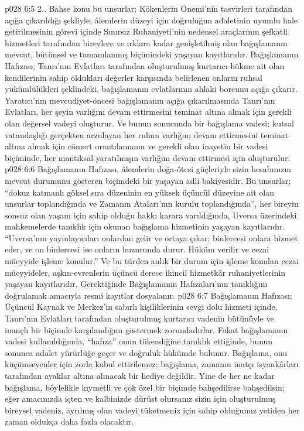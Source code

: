 \vs p028 6:5 2.\bibnobreakspace {}. Bahse konu bu unsurlar; Kökenlerin Önemi’nin tasvirleri tarafından açığa çıkarıldığı şekliyle, âlemlerin düzeyi için doğruluğun adaletinin uyumlu hale getirilmesinin görevi içinde Sınırsız Ruhaniyeti’nin nedensel araçlarının şefkatli hizmetleri tarafından bireylere ve ırklara kadar genişletilmiş olan bağışlamanın mevcut, bütünsel ve tamamlanmış biçimindeki yaşayan kayıtlarıdır. Bağışlamanın Hafızası; Tanrı’nın Evlatları tarafından oluşturulmuş kurtarıcı hükme ait olan kendilerinin sahip oldukları değerler karşısında belirlenen onların ruhsal yükümlülükleri şeklindeki, bağışlamanın evlatlarının ahlaki borcunu açığa çıkarır. Yaratıcı’nın mevcudiyet\hyp{}öncesi bağışlamanın açığa çıkarılmasında Tanrı’nın Evlatları, her şeyin varlığını devam ettirmesini teminat altına almak için gerekli olan değersel vadeyi oluşturur. Ve bunun sonucunda bir bağışlama vadesi; kutsal vatandaşlığı gerçekten arzulayan her ruhun varlığını devam ettirmesini teminat altına almak için cömert orantılamanın ve gerekli olan inayetin bir vadesi biçiminde, her mantıksal yaratılmışın varlığını devam ettirmesi için oluşturulur.
\vs p028 6:6 Bağışlamanın Hafızası, âlemlerin doğa\hyp{}ötesi güçleriyle sizin hesabınızın mevcut durumunu gösteren biçimdeki bir yaşayan adli bakiyesidir. Bu unsurlar; “dokuz katmanlı göksel sıra düzeninin en yüksek üçüncül düzeyine ait olan unsurlar toplandığında ve Zamanın Ataları’nın kurulu toplandığında”, her bireyin sonsuz olan yaşam için sahip olduğu hakkı karara varıldığında, Uversa üzerindeki mahkemelerde tanıklık için okunan bağışlama hizmetinin yaşayan kayıtlarıdır. “Uversa’nın yayınlayıcıları onlardan gelir ve ortaya çıkar; binlercesi onlara hizmet eder, ve on binlercesi ise onların huzurunda durur. Hüküm verilir ve cezai müeyyide işleme konulur.” Ve bu türden anlık bir durum için işleme konulan cezai müeyyideler, aşkın\hyp{}evrenlerin üçüncü derece ikincil hizmetkâr ruhaniyetlerinin yaşayan kayıtlarıdır. Gerektiğinde Bağışlamanın Hafızaları’nın tanıklığını doğrulamak amacıyla resmi kayıtlar dosyalanır.
\vs p028 6:7 Bağışlamanın Hafızası; Üçüncül Kaynak ve Merkez’in sabırlı kişiliklerinin sevgi dolu hizmeti içinde, Tanrı’nın Evlatları tarafından oluşturulmuş kurtarıcı vadenin bütünüyle ve inançlı bir biçimde karşılandığını göstermek zorundadırlar. Fakat bağışlamanın vadesi kullanıldığında, “hafıza” onun tükendiğine tanıklık ettiğinde, bunun sonunca adalet yürürlüğe geçer ve doğruluk hükümde bulunur. Bağışlama, onu küçümseyenler için zorla kabul ettirilemez; bağışlama, zamanın inatçı isyankârları tarafından ayaklar altına alınacak bir hediye değildir. Yine de her ne kadar bağışlama, böylelikle kıymetli ve çok özel bir biçimde bahşedilirse bahşedilsin; eğer amacınızda içten ve kalbinizde dürüst olursanız sizin için oluşturulmuş bireysel vadeniz, ayrılmış olan vadeyi tüketmeniz için sahip olduğunuz yetiden her zaman oldukça daha fazla olacaktır.
